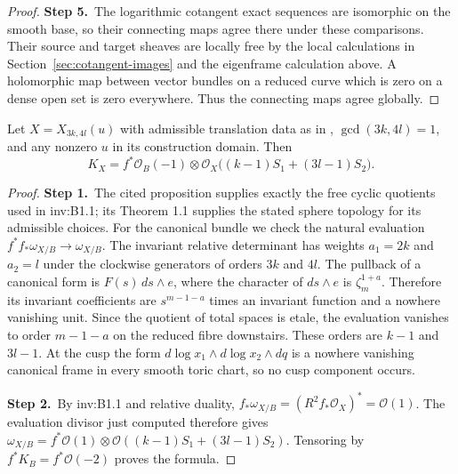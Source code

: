 \begin{proof}
\par\smallskip\noindent\textbf{Step 5.}\ The logarithmic cotangent exact sequences are isomorphic on the smooth
base, so their connecting maps agree there under these comparisons.
Their source and target sheaves are locally free by the local calculations
in Section~\ref{sec:cotangent-images} and the eigenframe calculation above. A holomorphic map between
vector bundles on a reduced curve which is zero on a dense open set is
zero everywhere. Thus the connecting maps agree globally.
\end{proof}

\begin{theorem}\label{inv:B2.1-canonical}
Let $X=X_{3k,4l}(u)$ with admissible translation data as in
\cite[Theorem 1.1 and Proposition 2.3]{VL26},
$\gcd(3k,4l)=1$, and any nonzero $u$ in its construction domain.
Then
\[
K_X=f^*\mathcal O_B(-1)\otimes
\mathcal O_X\bigl((k-1)S_1+(3l-1)S_2\bigr).
\]
\end{theorem}

\begin{proof}
\par\smallskip\noindent\textbf{Step 1.}\ The cited proposition supplies exactly the free cyclic quotients used
in inv:B1.1; its Theorem 1.1 supplies the stated sphere topology for its
admissible choices. For the canonical bundle we check the natural evaluation
$f^*f_*\omega_{X/B}\to\omega_{X/B}$.
The invariant relative determinant has weights $a_1=2k$ and $a_2=l$
under the clockwise generators of orders $3k$ and $4l$. The pullback
of a canonical form is $F(s)\,ds\wedge e$, where the character of
$ds\wedge e$ is $\zeta_m^{1+a}$. Therefore its invariant coefficients
are $s^{m-1-a}$ times an invariant function and a nowhere vanishing
unit. Since the quotient of total spaces is etale, the evaluation
vanishes to order $m-1-a$ on the reduced fibre downstairs. These orders
are $k-1$ and $3l-1$. At the cusp the form
$d\log x_1\wedge d\log x_2\wedge dq$ is a nowhere vanishing canonical
frame in every smooth toric chart, so no cusp component occurs.

\par\smallskip\noindent\textbf{Step 2.}\ By inv:B1.1 and relative duality,
$f_*\omega_{X/B}=(R^2f_*\mathcal O_X)^*=\mathcal O(1)$.
The evaluation divisor just computed therefore gives
$\omega_{X/B}=f^*\mathcal O(1)\otimes
\mathcal O((k-1)S_1+(3l-1)S_2)$. Tensoring by $f^*K_B=f^*\mathcal O(-2)$
proves the formula.
\end{proof}

